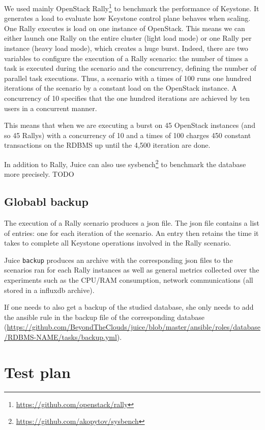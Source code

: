 We used mainly OpenStack Rally\footnote{\url{https://github.com/openstack/rally}} to benchmark the performance of Keystone. It generates a load to evaluate how Keystone control plane behaves when scaling.
One Rally executes is load on one instance of OpenStack. This means we can either launch one Rally on the entire cluster (light load mode) or one Rally per instance (heavy load mode), which creates a huge burst. Indeed, there are two variables to configure the execution of a Rally scenario: the number of times a task is executed during the scenario and the concurrency, defining the number of parallel task executions. Thus, a scenario with a times of 100 runs one hundred iterations of the scenario by a constant load on the OpenStack instance. A concurrency of 10 specifies that the one hundred iterations are achieved by ten users in a concurrent manner.

This means that when we are executing a burst on 45 OpenStack instances (and so 45 Rallys) with a concurrency of 10 and a times of 100 charges 450 constant transactions on the RDBMS up until the 4,500 iteration are done.

In addition to Rally, Juice can also use sysbench\footnote{\url{https://github.com/akopytov/sysbench}} to benchmark the database more precisely.
TODO


\subsection{Globabl backup}

The execution of a Rally scenario produces a json file. The json file contains a list of entries: one for each iteration of the scenario. An entry then retains the time it takes to complete all Keystone operations involved in the Rally scenario.

Juice \verb+backup+ produces an archive with the corresponding json files to the scenarios ran for each Rally instances as well as general metrics collected over the experiments such as the CPU/RAM consumption, network communications (all stored in a influxdb archive).

If one needs to also get a backup of the studied database, she only needs to add the ansible rule in the backup file of the corresponding database (\url{https://github.com/BeyondTheClouds/juice/blob/master/ansible/roles/database/RDBMS-NAME/tasks/backup.yml}).


\section{Test plan}
\label{sec:testplan}
